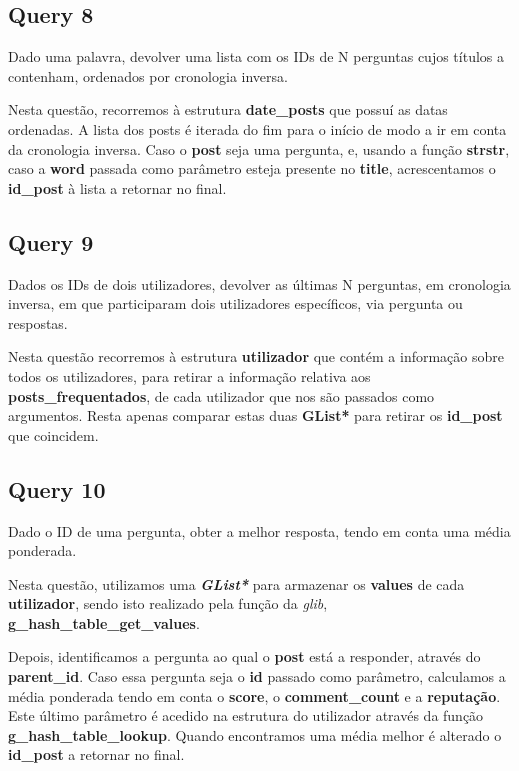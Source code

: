 \documentclass[a4paper]{article}
\begin{document}
\subsection{Query 8}

Dado uma palavra, devolver uma lista com os IDs de N perguntas
cujos títulos a contenham, ordenados por cronologia inversa.

Nesta questão, recorremos à estrutura \textbf{date\_posts} que possuí 
as datas ordenadas. A lista dos posts é iterada do fim para o início
de modo a ir em conta da cronologia inversa. Caso o \textbf{post} seja 
uma pergunta, e, usando a função \textbf{strstr}, caso a \textbf{word}
passada como parâmetro esteja presente no \textbf{title}, acrescentamos
o \textbf{id\_post} à lista a retornar no final.

\subsection{Query 9}

Dados os IDs de dois utilizadores, devolver as últimas N perguntas, em
cronologia inversa, em que participaram dois utilizadores específicos, 
via pergunta ou respostas.

Nesta questão recorremos à estrutura \textbf{utilizador} que contém a 
informação sobre todos os utilizadores, para retirar a informação relativa 
aos \textbf{posts\_frequentados}, de cada utilizador que nos são passados 
como argumentos. Resta apenas comparar estas duas \textbf{GList*} para
retirar os \textbf{id\_post} que coincidem.

\subsection{Query 10}

Dado o ID de uma pergunta, obter a melhor resposta, tendo em conta
uma média ponderada.

Nesta questão, utilizamos uma \textit{\textbf{GList*}} para armazenar 
os \textbf{values} de cada \textbf{utilizador}, sendo isto realizado
pela função da \textit{glib}, \textbf{g\_hash\_table\_get\_values}.

Depois, identificamos a pergunta ao qual o \textbf{post} está a responder,
através do \textbf{parent\_id}. Caso essa pergunta seja o \textbf{id}
passado como parâmetro, calculamos a média ponderada tendo em conta o
\textbf{score}, o \textbf{comment\_count} e a \textbf{reputação}. Este
último parâmetro é acedido na estrutura do utilizador através da função
\textbf{g\_hash\_table\_lookup}. Quando encontramos uma média melhor é
alterado o \textbf{id\_post} a retornar no final.
\end{document}
